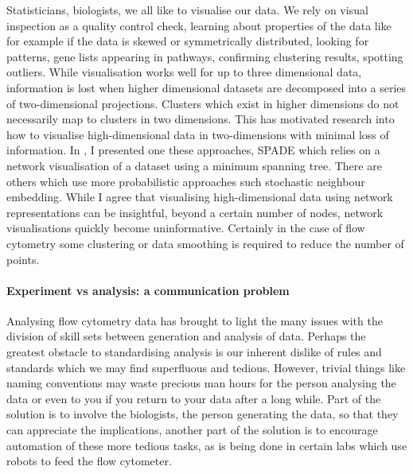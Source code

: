 Statisticians, biologists, we all like to visualise our data.
We rely on visual inspection as a quality control check, learning about properties of the data like for example if the data
is skewed or symmetrically distributed, looking for patterns, gene lists appearing in pathways, confirming clustering results, spotting outliers.
While visualisation works well for up to three dimensional data, information is lost when higher dimensional datasets are decomposed into a series of two-dimensional projections.
Clusters which exist in higher dimensions do not necessarily map to clusters in two dimensions.
This has motivated research into how to visualise high-dimensional data in two-dimensions with minimal loss of information.
In , I presented one these approaches, \gls{SPADE} which relies on a network visualisation of a dataset using a minimum spanning tree.
There are others which use more probabilistic approaches such stochastic neighbour embedding.
While I agree that visualising high-dimensional data using network representations can be insightful,
beyond a certain number of nodes, network visualisations quickly become uninformative.
Certainly in the case of flow cytometry some clustering or data smoothing is required to reduce the number of points.  



\paragraph{Experiment vs analysis: a communication problem}

Analysing flow cytometry data has brought to light the many issues with the division of skill sets between generation and analysis of data.
Perhaps the greatest obstacle to standardising analysis is our inherent dislike of rules and standards which we may find superfluous and tedious.
However, trivial things like naming conventions may waste precious man hours for the person analysing the data or even to you if you return to your data after a long while.
Part of the solution is to involve the biologists, the person generating the data, so that they can appreciate the implications, another part of the solution is to encourage automation of these more tedious tasks, as is being done in certain labs which use robots to feed the flow cytometer.

